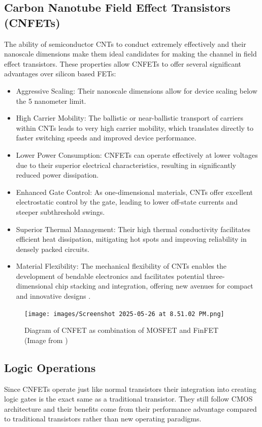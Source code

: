 \documentclass[sigconf]{acmart}
\begin{document}
\subsection{Carbon Nanotube Field Effect Transistors (CNFETs)}
The ability of semiconductor CNTs to conduct extremely effectively 
and their nanoscale dimensions make them ideal candidates for 
making the channel in field effect transistors. These properties 
allow CNFETs to offer several significant advantages over silicon 
based FETs:
\begin{itemize}
  \item Aggressive Scaling: Their nanoscale dimensions allow for
  device scaling below the 5 nanometer limit.
  \item High Carrier Mobility: The ballistic or near-ballistic 
  transport of carriers within CNTs leads to very high carrier
  mobility, which translates directly to faster switching speeds 
  and improved device performance.
  \item Lower Power Consumption: CNFETs can operate effectively 
  at lower voltages due to their superior electrical 
  characteristics, resulting in significantly reduced power 
  dissipation.
  \item Enhanced Gate Control: As one-dimensional materials, 
  CNTs offer excellent electrostatic control by the gate, 
  leading to lower off-state currents and steeper subthreshold 
  swings.
  \item Superior Thermal Management: Their high thermal 
  conductivity facilitates efficient heat dissipation, 
  mitigating hot spots and improving reliability in densely 
  packed circuits.
  \item Material Flexibility: The mechanical flexibility of CNTs 
  enables the development of bendable electronics and facilitates 
  potential three-dimensional chip stacking and integration, 
  offering new avenues for compact and innovative designs \cite{javey2003ballistic}.
\end{itemize}

\begin{figure}[h]
  \centering
  \texttt{[image: images/Screenshot 2025-05-26 at 8.51.02 PM.png]}
  \caption{Diagram of CNFET as combination of MOSFET and FinFET (Image from \cite{appenzeller2008carbon})}
\end{figure}

\subsection{Logic Operations}
Since CNFETs operate just like normal transistors their integration 
into creating logic gates is the exact same as a traditional 
transistor. They still follow CMOS architecture and their benefits 
come from their performance advantage compared to traditional transistors rather than 
new operating paradigms. 
\end{document}
